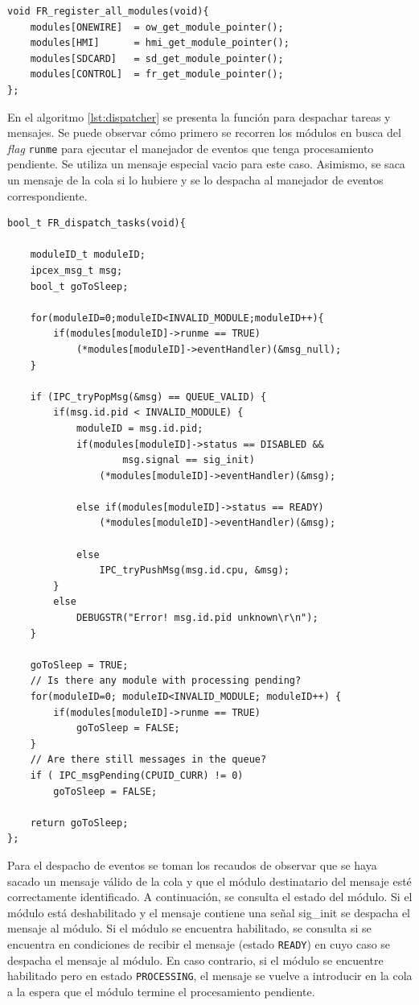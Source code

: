 \begin{lstlisting}[caption={Función para registrar los módulos del sistema.},label={lst:register}]
void FR_register_all_modules(void){
	modules[ONEWIRE]  = ow_get_module_pointer();
	modules[HMI]      = hmi_get_module_pointer();
	modules[SDCARD]   = sd_get_module_pointer();
	modules[CONTROL]  = fr_get_module_pointer();
};
\end{lstlisting}

En el algoritmo \ref{lst:dispatcher} se presenta la función para despachar tareas y mensajes.  Se puede observar cómo primero se recorren los módulos en busca del \textit{flag} \texttt{runme} para ejecutar el manejador de eventos que tenga procesamiento pendiente. Se utiliza un mensaje especial vacio para este caso. Asimismo, se saca un mensaje de la cola si lo hubiere y se lo despacha al manejador de eventos correspondiente.

\vspace{10px}
\begin{lstlisting}[caption={Función para despachar tareas y mensajes.},label={lst:dispatcher}]
bool_t FR_dispatch_tasks(void){

	moduleID_t moduleID;
	ipcex_msg_t msg;
	bool_t goToSleep;

	for(moduleID=0;moduleID<INVALID_MODULE;moduleID++){
		if(modules[moduleID]->runme == TRUE)
			(*modules[moduleID]->eventHandler)(&msg_null);
	}

	if (IPC_tryPopMsg(&msg) == QUEUE_VALID) {
		if(msg.id.pid < INVALID_MODULE) {
			moduleID = msg.id.pid;
			if(modules[moduleID]->status == DISABLED &&
					msg.signal == sig_init)
				(*modules[moduleID]->eventHandler)(&msg);

			else if(modules[moduleID]->status == READY)
				(*modules[moduleID]->eventHandler)(&msg);

			else
				IPC_tryPushMsg(msg.id.cpu, &msg);
		}
		else
			DEBUGSTR("Error! msg.id.pid unknown\r\n");
	}

	goToSleep = TRUE;
	// Is there any module with processing pending?
	for(moduleID=0; moduleID<INVALID_MODULE; moduleID++) {
		if(modules[moduleID]->runme == TRUE)
			goToSleep = FALSE;
	}
	// Are there still messages in the queue?
	if ( IPC_msgPending(CPUID_CURR) != 0)
		goToSleep = FALSE;

	return goToSleep;
};
\end{lstlisting}

Para el despacho de eventos se toman los recaudos de observar que se haya sacado un mensaje válido de la cola y que el módulo destinatario del mensaje esté correctamente identificado.  A continuación, se consulta el estado del módulo.  Si el módulo está deshabilitado y el mensaje contiene una señal sig\_init se despacha el mensaje al módulo. Si el módulo se encuentra habilitado, se consulta si se encuentra en condiciones de recibir el mensaje (estado \texttt{READY}) en cuyo caso se despacha el mensaje al módulo.  En caso contrario, si el módulo se encuentre habilitado pero en estado \texttt{PROCESSING}, el mensaje se vuelve a introducir en la cola a la espera que el módulo termine el procesamiento pendiente.

